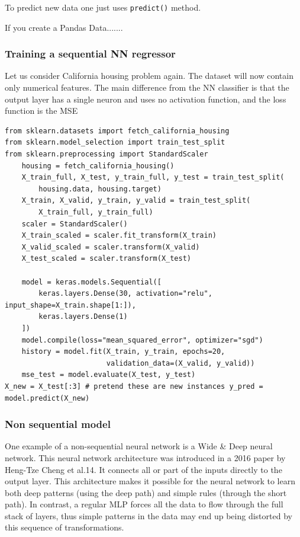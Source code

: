 To predict new data one just uses \lstinline+predict()+ method.

If you create a Pandas Data.......

\subsubsection{Training a sequential NN regressor}
Let us consider California housing problem again. The dataset will now contain only numerical features. The main difference from the NN classifier is that the output layer has a single neuron and uses no activation function, and the loss function is the MSE

\begin{lstlisting}
from sklearn.datasets import fetch_california_housing 
from sklearn.model_selection import train_test_split 
from sklearn.preprocessing import StandardScaler
    housing = fetch_california_housing()
    X_train_full, X_test, y_train_full, y_test = train_test_split(
        housing.data, housing.target)
    X_train, X_valid, y_train, y_valid = train_test_split(
        X_train_full, y_train_full)
    scaler = StandardScaler()
    X_train_scaled = scaler.fit_transform(X_train)
    X_valid_scaled = scaler.transform(X_valid)
    X_test_scaled = scaler.transform(X_test)
    
    model = keras.models.Sequential([
        keras.layers.Dense(30, activation="relu", input_shape=X_train.shape[1:]),
        keras.layers.Dense(1)
    ])
    model.compile(loss="mean_squared_error", optimizer="sgd")
    history = model.fit(X_train, y_train, epochs=20,
                        validation_data=(X_valid, y_valid))
    mse_test = model.evaluate(X_test, y_test)
X_new = X_test[:3] # pretend these are new instances y_pred = model.predict(X_new)
\end{lstlisting}

\subsubsection{Non sequential model}
One example of a non-sequential neural network is a Wide \& Deep neural network. This neural network architecture was introduced in a 2016 paper by Heng-Tze Cheng et al.14. It connects all or part of the inputs directly to the output layer. This architecture makes it possible for the neural network to learn both deep patterns (using the deep path) and simple rules (through the short path). In contrast, a regular MLP forces all the data to flow through the full stack of layers, thus simple patterns in the data may end up being distorted by this sequence of transformations.

